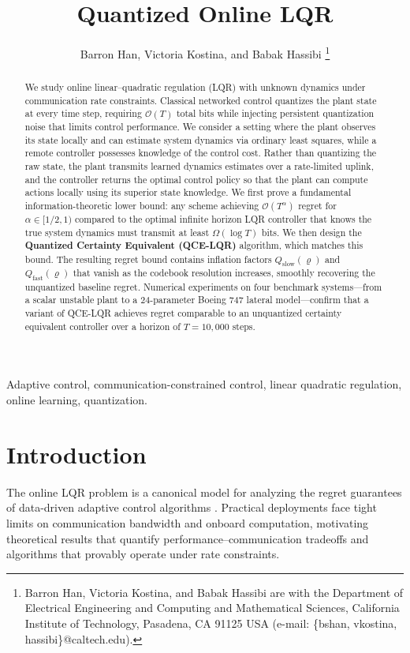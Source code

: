 \documentclass[11pt,journal,onecolumn]{IEEEtran}
\title{Quantized Online LQR}
\author{Barron Han, Victoria Kostina, and Babak Hassibi%
\thanks{Barron Han, Victoria Kostina, and Babak Hassibi are with the Department of Electrical Engineering and Computing and Mathematical Sciences, California Institute of Technology, Pasadena, CA 91125 USA (e-mail: \{bshan, vkostina, hassibi\}@caltech.edu).}%
}
\begin{document}
\maketitle

\begin{abstract}
We study online linear--quadratic regulation (LQR) with unknown dynamics under communication rate constraints. Classical networked control quantizes the plant state at every time step, requiring $\mathcal{O}(T)$ total bits while injecting persistent quantization noise that limits control performance. We consider a setting where the plant observes its state locally and can estimate system dynamics via ordinary least squares, while a remote controller possesses knowledge of the control cost. Rather than quantizing the raw state, the plant transmits learned dynamics estimates over a rate-limited uplink, and the controller returns the optimal control policy so that the plant can compute actions locally using its superior state knowledge. We first prove a fundamental information-theoretic lower bound: any scheme achieving $\mathcal{O}(T^\alpha)$ regret for $\alpha \in [1/2,1)$ compared to the optimal infinite horizon LQR controller that knows the true system dynamics must transmit at least $\Omega(\log T)$ bits. We then design the \textbf{Quantized Certainty Equivalent (QCE-LQR)} algorithm, which matches this bound. The resulting regret bound contains inflation factors $Q_{\mathrm{slow}}(\varrho)$ and $Q_{\mathrm{fast}}(\varrho)$ that vanish as the codebook resolution increases, smoothly recovering the unquantized baseline regret. Numerical experiments on four benchmark systems---from a scalar unstable plant to a 24-parameter Boeing 747 lateral model---confirm that a variant of QCE-LQR achieves regret comparable to an unquantized certainty equivalent controller over a horizon of $T=10{,}000$ steps.
\end{abstract}

\begin{IEEEkeywords}
Adaptive control, communication-constrained control, linear quadratic regulation, online learning, quantization.
\end{IEEEkeywords}

\section{Introduction}

The online LQR problem is a canonical model for analyzing the regret guarantees of data-driven adaptive control algorithms \cite{simchowitz20a, mania2019}. Practical deployments face tight limits on communication bandwidth and onboard computation, motivating theoretical results that quantify performance--communication tradeoffs and algorithms that provably operate under rate constraints.
\end{document}
